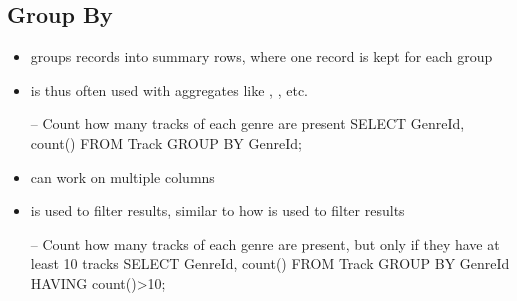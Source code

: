 \documentclass[a4paper]{article}
\begin{document}
\subsection{Group By}
\begin{itemize}
    \item {} groups records into summary rows, where one record is kept for each group
    \item {} is thus often used with aggregates like , , etc.
\begin{sql}
-- Count how many tracks of each genre are present
SELECT GenreId, count()
FROM Track
GROUP BY GenreId;
\end{sql}
    \item {} can work on multiple columns
    \item {} is used to filter  results, similar to how  is used to filter  results
\begin{sql}
-- Count how many tracks of each genre are present, but only if they have at least 10 tracks
SELECT GenreId, count()
FROM Track
GROUP BY GenreId
HAVING count()>10;
\end{sql}
\end{itemize}
\end{document}
